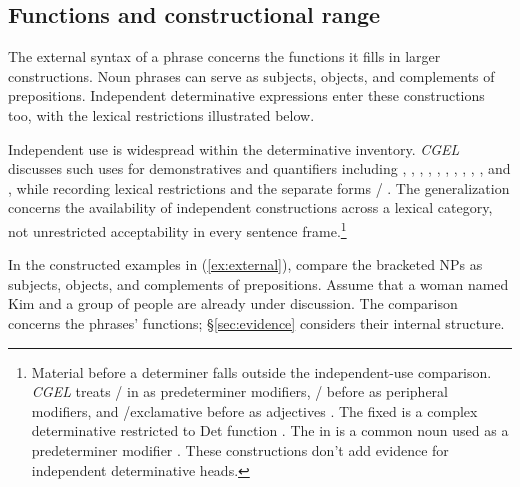 \documentclass[12pt]{article}
\begin{document}
\subsection{Functions and constructional range}\label{sec:independent}

The external syntax of a phrase concerns the functions it fills in larger constructions. Noun phrases can serve as subjects, objects, and complements of prepositions. Independent determinative expressions enter these constructions too, with the lexical restrictions illustrated below.

Independent use is widespread within the determinative inventory. \textit{CGEL} discusses such uses for demonstratives and quantifiers including , , , , , , , , , , and , while recording lexical restrictions and the separate forms / \citep[371--372, 410--424]{huddleston2002}. The generalization concerns the availability of independent constructions across a lexical category, not unrestricted acceptability in every sentence frame.\footnote{Material before a determiner falls outside the independent-use comparison. \textit{CGEL} treats / in  as predeterminer modifiers, / before  as peripheral modifiers, and /exclamative  before  as adjectives \citep[433--437]{huddleston2002}. The fixed  is a complex determinative restricted to Det function \citep[394]{huddleston2002}. The  in  is a common noun used as a predeterminer modifier \citep[434]{huddleston2002}. These constructions don't add evidence for independent determinative heads.}

In the constructed examples in (\ref{ex:external}), compare the bracketed NPs as subjects, objects, and complements of prepositions. Assume that a woman named Kim and a group of people are already under discussion. The comparison concerns the phrases' functions; §\ref{sec:evidence} considers their internal structure.

\begin{samepage}

\ea\label{ex:external}
\ea {}\qquad {}\qquad {}
\ex {}\qquad {}\qquad {}
\ex {}\qquad {}\qquad {}
\ex {}\qquad {}\qquad {}
\z\z

\end{samepage}
\end{document}
